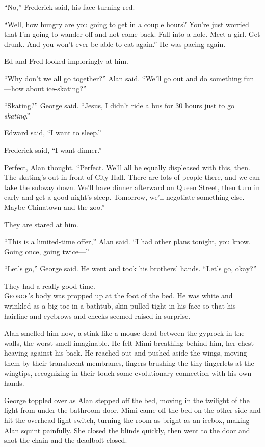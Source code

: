 \documentclass{article}
\begin{document}
``No,'' Frederick said, his face turning red.

``Well, how hungry are you going to get in a couple hours?  You're
just worried that I'm going to wander off and not come back.  Fall
into a hole.  Meet a girl.  Get drunk.  And you won't ever be able to
eat again.'' He was pacing again.

Ed and Fred looked imploringly at him.

``Why don't we all go together?'' Alan said.  ``We'll go out and do
something fun---how about ice-skating?''

``Skating?'' George said.  ``Jesus, I didn't ride a bus for 30 hours
just to go \textit{skating}.''

Edward said, ``I want to sleep.''

Frederick said, ``I want dinner.''

Perfect, Alan thought.  ``Perfect.  We'll all be equally displeased
with this, then.  The skating's out in front of City Hall.  There are
lots of people there, and we can take the subway down.  We'll have
dinner afterward on Queen Street, then turn in early and get a good
night's sleep.  Tomorrow, we'll negotiate something else.  Maybe
Chinatown and the zoo.''

They are stared at him.

``This is a limited-time offer,'' Alan said.  ``I had other plans
tonight, you know.  Going once, going twice---''

``Let's go,'' George said.  He went and took his brothers' hands. 
``Let's go, okay?''

They had a really good time.
\\
\lettrine[lines=3, lhang=.5, nindent=0pt, findent=2pt]{G}{eorge}'s body was propped up at the foot of the bed.  He was white and
wrinkled as a big toe in a bathtub, skin pulled tight in his face so
that his hairline and eyebrows and cheeks seemed raised in surprise.

Alan smelled him now, a stink like a mouse dead between the gyprock in
the walls, the worst smell imaginable.  He felt Mimi breathing behind
him, her chest heaving against his back.  He reached out and pushed
aside the wings, moving them by their translucent membranes, fingers
brushing the tiny fingerlets at the wingtips, recognizing in their
touch some evolutionary connection with his own hands.

George toppled over as Alan stepped off the bed, moving in the
twilight of the light from under the bathroom door.  Mimi came off the
bed on the other side and hit the overhead light switch, turning the
room as bright as an icebox, making Alan squint painfully.  She closed
the blinds quickly, then went to the door and shot the chain and the
deadbolt closed.
\end{document}
